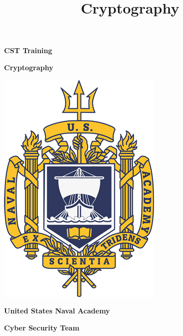 \documentclass{report}
\title{Cryptography}
\begin{document}
\begin{titlepage}
    \vspace*{-2cm}
    \begin{center}
        {\Huge \bfseries CST Training \par}
        \vspace{1cm}
        {\large \bfseries Cryptography  \par}

    \end{center}
    \begin{center}
        \vspace{3cm}
        \includegraphics[scale=.6]{usna-seal.png}
        \vspace{1cm}
    \end{center}
    

  
    \begin{center}
        {\LARGE\bfseries United States Naval Academy \break \par}
        {\Large\bfseries Cyber Security Team \par}

    \end{center}
  
    \vspace{3.0cm}
   


\end{titlepage}


\newpage
\end{document}
